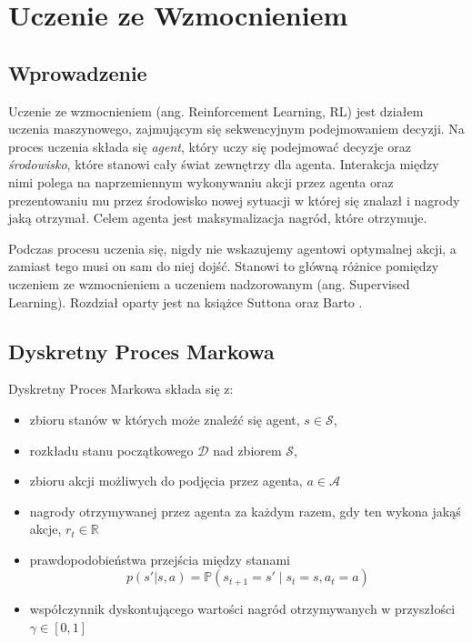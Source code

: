 \documentclass[licencjacka]{pracamgr}
\begin{document}
\chapter{Uczenie ze Wzmocnieniem}\label{r:rl}

\section{Wprowadzenie}

Uczenie ze wzmocnieniem (ang. Reinforcement Learning, RL) \cite{Sutton, Szepesvari} jest działem uczenia maszynowego, zajmującym się sekwencyjnym podejmowaniem decyzji. Na proces uczenia składa się \emph{agent}, który uczy się podejmować decyzje oraz \emph{środowisko}, które stanowi cały świat zewnętrzy dla agenta. Interakcja między nimi polega na naprzemiennym wykonywaniu akcji przez agenta oraz prezentowaniu mu przez środowisko nowej sytuacji w której się znalazł i nagrody jaką otrzymał. Celem agenta jest maksymalizacja nagród, które otrzymuje.

Podczas procesu uczenia się, nigdy nie wskazujemy agentowi optymalnej akcji, a zamiast tego musi on sam do niej dojść. Stanowi to główną różnice pomiędzy uczeniem ze wzmocnieniem a uczeniem nadzorowanym (ang. Supervised Learning). Rozdział oparty jest na książce Suttona oraz Barto \cite{Sutton}.

\section{Dyskretny Proces Markowa}

Dyskretny Proces Markowa składa się z:
\begin{itemize}
\item zbioru stanów w których może znaleźć się agent, $ s \in \mathcal{S} $,
\item rozkładu stanu początkowego $\mathcal{D}$ nad zbiorem $\mathcal{S}$,
\item zbioru akcji możliwych do podjęcia przez agenta, $ a \in \mathcal{A} $
\item nagrody otrzymywanej przez agenta za każdym razem, gdy ten wykona jakąś akcje, $ r_t \in \mathbb{R} $
\item prawdopodobieństwa przejścia między stanami
$$ p(s'|s, a) = \mathbb{P}(s_{t+1} = s' \mid s_t = s, a_t = a)$$
\item współczynnik dyskontującego wartości nagród otrzymywanych w przyszłości $ \gamma \in [0, 1] $
\end{itemize}
\end{document}
